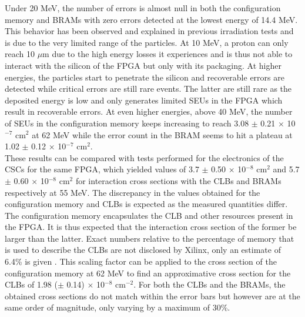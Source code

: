       Under 20 MeV, the number of errors is almost null in both the configuration memory and BRAMs with zero errors detected at the lowest energy of 14.4 MeV. This behavior has been observed and explained in previous irradiation tests \cite{Bylsma2013242, Huhtinen2000155} and is due to the very limited range of the particles. At 10 MeV, a proton can only reach 10 $\mu$m due to the high energy losses it experiences and is thus not able to interact with the silicon of the FPGA but only with its packaging. At higher energies, the particles start to penetrate the silicon and recoverable errors are detected while critical errors are still rare events. The latter are still rare as the deposited energy is low and only generates limited SEUs in the FPGA which result in recoverable errors. At even higher energies, above 40 MeV, the number of SEUs in the configuration memory keeps increasing to reach 3.08 $\pm$ 0.21 $ \times $ 10$^{-7}$ cm$^{2}$ at 62 MeV while the error count in the BRAM seems to hit a plateau at 1.02 $\pm$ 0.12 $ \times $ 10$^{-7}$ cm$^2$. \\

      These results can be compared with tests performed for the electronics of the CSCs \cite{Bylsma2013242} for the same FPGA, which yielded values of 3.7 $\pm$ 0.50 $ \times $ 10$^{-8}$ cm$^2$ and 5.7 $\pm$ 0.60 $ \times $ 10$^{-8}$ cm$^2$ for interaction cross sections with the CLBs and BRAMs respectively at 55 MeV. The discrepancy in the values obtained for the configuration memory and CLBs is expected as the measured quantities differ. The configuration memory encapsulates the CLB and other resources present in the FPGA. It is thus expected that the interaction cross section of the former be larger than the latter. Exact numbers relative to the percentage of memory that is used to describe the CLBs are not disclosed by Xilinx, only an estimate of 6.4\% is given \cite{XILINX-SEM}. This scaling factor can be applied to the cross section of the configuration memory at 62 MeV to find an approximative cross section for the CLBs of 1.98 ($\pm$ 0.14) $\times$ 10$^{-8}$ cm$^{-2}$. For both the CLBs and the BRAMs, the obtained cross sections do not match within the error bars but however are at the same order of magnitude, only varying by a maximum of 30\%. \\

